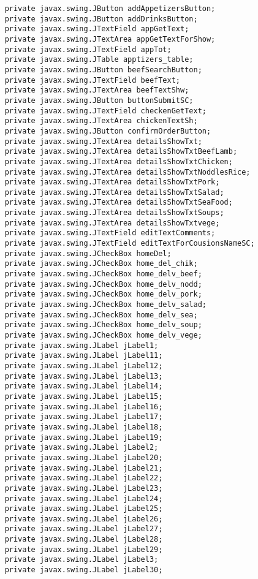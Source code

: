 \documentclass[12pt,a4paper]{article}
\begin{document}
\begin{lstlisting}
    private javax.swing.JButton addAppetizersButton;
    private javax.swing.JButton addDrinksButton;
    private javax.swing.JTextField appGetText;
    private javax.swing.JTextArea appGetTextForShow;
    private javax.swing.JTextField appTot;
    private javax.swing.JTable apptizers_table;
    private javax.swing.JButton beefSearchButton;
    private javax.swing.JTextField beefText;
    private javax.swing.JTextArea beefTextShw;
    private javax.swing.JButton buttonSubmitSC;
    private javax.swing.JTextField checkenGetText;
    private javax.swing.JTextArea chickenTextSh;
    private javax.swing.JButton confirmOrderButton;
    private javax.swing.JTextArea detailsShowTxt;
    private javax.swing.JTextArea detailsShowTxtBeefLamb;
    private javax.swing.JTextArea detailsShowTxtChicken;
    private javax.swing.JTextArea detailsShowTxtNoddlesRice;
    private javax.swing.JTextArea detailsShowTxtPork;
    private javax.swing.JTextArea detailsShowTxtSalad;
    private javax.swing.JTextArea detailsShowTxtSeaFood;
    private javax.swing.JTextArea detailsShowTxtSoups;
    private javax.swing.JTextArea detailsShowTxtvege;
    private javax.swing.JTextField editTextComments;
    private javax.swing.JTextField editTextForCousionsNameSC;
    private javax.swing.JCheckBox homeDel;
    private javax.swing.JCheckBox home_del_chik;
    private javax.swing.JCheckBox home_delv_beef;
    private javax.swing.JCheckBox home_delv_nodd;
    private javax.swing.JCheckBox home_delv_pork;
    private javax.swing.JCheckBox home_delv_salad;
    private javax.swing.JCheckBox home_delv_sea;
    private javax.swing.JCheckBox home_delv_soup;
    private javax.swing.JCheckBox home_delv_vege;
    private javax.swing.JLabel jLabel1;
    private javax.swing.JLabel jLabel11;
    private javax.swing.JLabel jLabel12;
    private javax.swing.JLabel jLabel13;
    private javax.swing.JLabel jLabel14;
    private javax.swing.JLabel jLabel15;
    private javax.swing.JLabel jLabel16;
    private javax.swing.JLabel jLabel17;
    private javax.swing.JLabel jLabel18;
    private javax.swing.JLabel jLabel19;
    private javax.swing.JLabel jLabel2;
    private javax.swing.JLabel jLabel20;
    private javax.swing.JLabel jLabel21;
    private javax.swing.JLabel jLabel22;
    private javax.swing.JLabel jLabel23;
    private javax.swing.JLabel jLabel24;
    private javax.swing.JLabel jLabel25;
    private javax.swing.JLabel jLabel26;
    private javax.swing.JLabel jLabel27;
    private javax.swing.JLabel jLabel28;
    private javax.swing.JLabel jLabel29;
    private javax.swing.JLabel jLabel3;
    private javax.swing.JLabel jLabel30;

\end{lstlisting}
\end{document}

